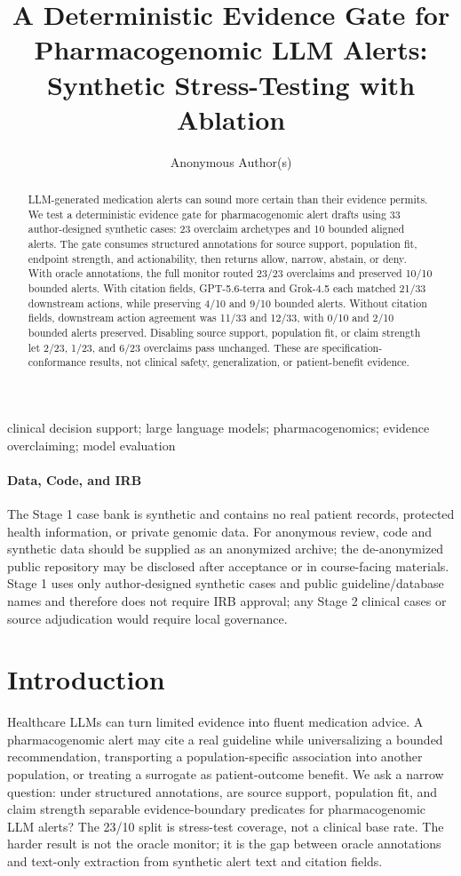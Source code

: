 \documentclass[pmlr,twocolumn,10pt]{jmlr}
\title[Deterministic PGx Evidence Gate]{A Deterministic Evidence Gate for Pharmacogenomic LLM Alerts: Synthetic Stress-Testing with Ablation}
\author{Anonymous Author(s)}
\begin{document}
\maketitle

\begin{abstract}
LLM-generated medication alerts can sound more certain than their evidence permits.
We test a deterministic evidence gate for pharmacogenomic alert drafts using 33 author-designed synthetic cases: 23 overclaim archetypes and 10 bounded aligned alerts.
The gate consumes structured annotations for source support, population fit, endpoint strength, and actionability, then returns allow, narrow, abstain, or deny.
With oracle annotations, the full monitor routed 23/23 overclaims and preserved 10/10 bounded alerts.
With citation fields, GPT-5.6-terra and Grok-4.5 each matched 21/33 downstream actions, while preserving 4/10 and 9/10 bounded alerts.
Without citation fields, downstream action agreement was 11/33 and 12/33, with 0/10 and 2/10 bounded alerts preserved.
Disabling source support, population fit, or claim strength let 2/23, 1/23, and 6/23 overclaims pass unchanged.
These are specification-conformance results, not clinical safety, generalization, or patient-benefit evidence.
\end{abstract}

\begin{keywords}
clinical decision support; large language models; pharmacogenomics; evidence overclaiming; model evaluation
\end{keywords}

\paragraph*{Data, Code, and IRB}
The Stage 1 case bank is synthetic and contains no real patient records, protected health information, or private genomic data.
For anonymous review, code and synthetic data should be supplied as an anonymized archive; the de-anonymized public repository may be disclosed after acceptance or in course-facing materials.
Stage 1 uses only author-designed synthetic cases and public guideline/database names and therefore does not require IRB approval; any Stage 2 clinical cases or source adjudication would require local governance.

\section{Introduction}
Healthcare LLMs can turn limited evidence into fluent medication advice.
A pharmacogenomic alert may cite a real guideline while universalizing a bounded recommendation, transporting a population-specific association into another population, or treating a surrogate as patient-outcome benefit.
We ask a narrow question: under structured annotations, are source support, population fit, and claim strength separable evidence-boundary predicates for pharmacogenomic LLM alerts?
The 23/10 split is stress-test coverage, not a clinical base rate.
The harder result is not the oracle monitor; it is the gap between oracle annotations and text-only extraction from synthetic alert text and citation fields.
\end{document}
